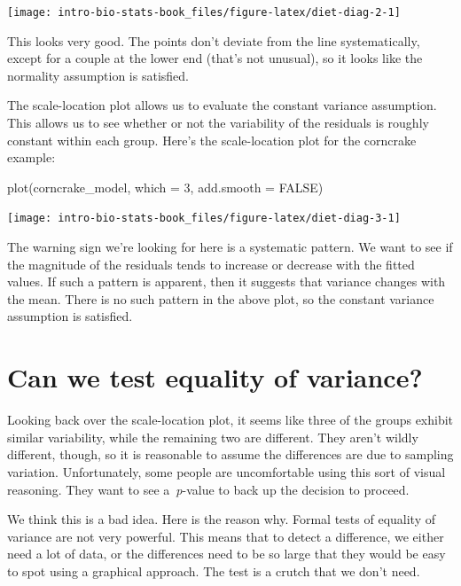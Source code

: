 \documentclass[
]{book}
\newenvironment{Shaded}{\begin{snugshade}}{\end{snugshade}}
\newcommand{\AttributeTok}[1]{\textcolor[rgb]{0.77,0.63,0.00}{#1}}
\newcommand{\ConstantTok}[1]{\textcolor[rgb]{0.00,0.00,0.00}{#1}}
\newcommand{\DecValTok}[1]{\textcolor[rgb]{0.00,0.00,0.81}{#1}}
\newcommand{\FunctionTok}[1]{\textcolor[rgb]{0.00,0.00,0.00}{#1}}
\newcommand{\NormalTok}[1]{#1}
\begin{document}
\begin{center}\texttt{[image: intro-bio-stats-book\_files/figure-latex/diet-diag-2-1]} \end{center}

This looks very good. The points don't deviate from the line systematically, except for a couple at the lower end (that's not unusual), so it looks like the normality assumption is satisfied.

The scale-location plot allows us to evaluate the constant variance assumption. This allows us to see whether or not the variability of the residuals is roughly constant within each group. Here's the scale-location plot for the corncrake example:

\begin{Shaded}
\begin{Highlighting}[]
\FunctionTok{plot}\NormalTok{(corncrake\_model, }\AttributeTok{which =} \DecValTok{3}\NormalTok{, }\AttributeTok{add.smooth =} \ConstantTok{FALSE}\NormalTok{)}
\end{Highlighting}
\end{Shaded}

\begin{center}\texttt{[image: intro-bio-stats-book\_files/figure-latex/diet-diag-3-1]} \end{center}

The warning sign we're looking for here is a systematic pattern. We want to see if the magnitude of the residuals tends to increase or decrease with the fitted values. If such a pattern is apparent, then it suggests that variance changes with the mean. There is no such pattern in the above plot, so the constant variance assumption is satisfied.

\hypertarget{can-we-test-equality-of-variance}{%
\section{Can we test equality of variance?}\label{can-we-test-equality-of-variance}}

Looking back over the scale-location plot, it seems like three of the groups exhibit similar variability, while the remaining two are different. They aren't wildly different, though, so it is reasonable to assume the differences are due to sampling variation. Unfortunately, some people are uncomfortable using this sort of visual reasoning. They want to see a~\emph{p}-value to back up the decision to proceed.

We think this is a bad idea. Here is the reason why. Formal tests of equality of variance are not very powerful. This means that to detect a difference, we either need a lot of data, or the differences need to be so large that they would be easy to spot using a graphical approach. The test is a crutch that we don't need.
\end{document}
